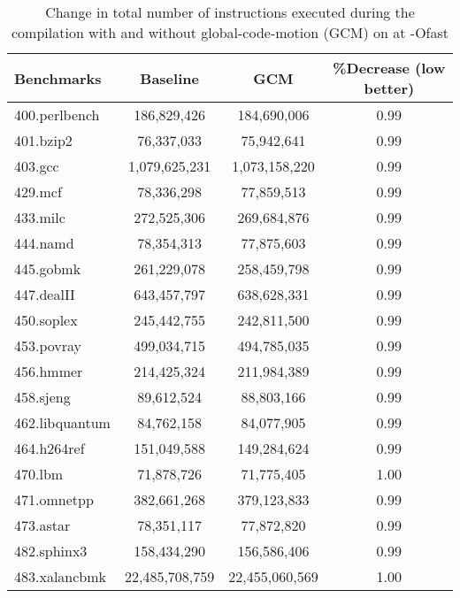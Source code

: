 \documentclass[acmlarge,review,anonymous]{acmart}\settopmatter{printfolios=true}
\begin{document}
\begin{table}[h]
  \begin{center}
    \begin{tabular}{|l|c|c|c|}
      \hline
  Benchmarks      &   Baseline	        & GCM           & \%Decrease (low better) \\\hline
  400.perlbench	  &   186,829,426	& 184,690,006	& 0.99 \\\hline
  401.bzip2	  &   76,337,033	& 75,942,641	& 0.99 \\\hline
  403.gcc         &   1,079,625,231	& 1,073,158,220	& 0.99 \\\hline
  429.mcf         &   78,336,298	& 77,859,513	& 0.99 \\\hline
  433.milc	  &   272,525,306	& 269,684,876	& 0.99 \\\hline
  444.namd	  &   78,354,313	& 77,875,603	& 0.99 \\\hline
  445.gobmk	  &   261,229,078	& 258,459,798	& 0.99 \\\hline
  447.dealII	  &   643,457,797	& 638,628,331	& 0.99 \\\hline
  450.soplex	  &   245,442,755	& 242,811,500	& 0.99 \\\hline
  453.povray	  &   499,034,715	& 494,785,035	& 0.99 \\\hline
  456.hmmer	  &   214,425,324	& 211,984,389	& 0.99 \\\hline
  458.sjeng	  &   89,612,524	& 88,803,166	& 0.99 \\\hline
  462.libquantum  &   84,762,158	& 84,077,905	& 0.99 \\\hline
  464.h264ref	  &   151,049,588	& 149,284,624	& 0.99 \\\hline
  470.lbm         &   71,878,726	& 71,775,405	& 1.00 \\\hline
  471.omnetpp	  &   382,661,268	& 379,123,833	& 0.99 \\\hline
  473.astar	  &   78,351,117	& 77,872,820	& 0.99 \\\hline
  482.sphinx3	  &   158,434,290	& 156,586,406	& 0.99 \\\hline
  483.xalancbmk	  &   22,485,708,759	& 22,455,060,569& 1.00 \\\hline
    \end{tabular}
  \end{center}
  \caption{Change in total number of instructions executed during the
    compilation with and without global-code-motion (GCM) on \SPEC{} at -Ofast}
  \label{tab:compile-time}
\end{table}
\end{document}
